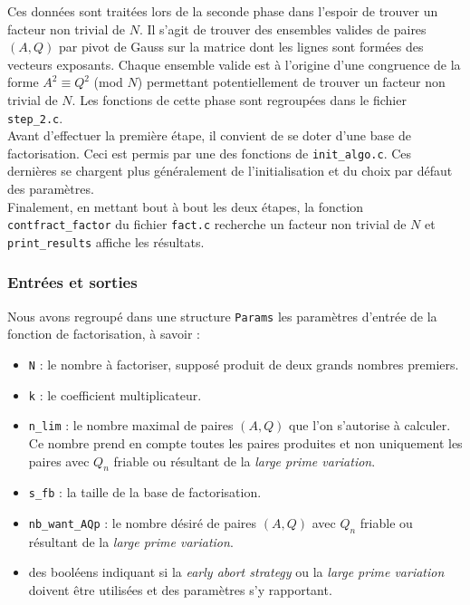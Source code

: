 Ces données sont traitées lors de la seconde phase dans l'espoir de trouver un 
facteur non trivial de $N$. Il s'agit de trouver des ensembles valides de paires
$(A, Q)$ par pivot de Gauss sur la matrice dont les lignes sont formées des 
vecteurs exposants. Chaque ensemble valide est à l'origine d'une congruence de 
la forme $A^2 \equiv Q^2$ (mod $N$) permettant potentiellement de trouver un
facteur non trivial de $N$. Les fonctions de cette phase sont regroupées dans 
le fichier \texttt{step\_2.c}. \\

Avant d'effectuer la première étape, il convient de se doter d'une base de 
factorisation. Ceci est permis par une des fonctions de \texttt{init\_algo.c}.
Ces dernières se chargent plus généralement de l'initialisation et du choix par
défaut des paramètres. \\

Finalement, en mettant bout à bout les deux étapes, la fonction 
\texttt{contfract\_factor} du fichier \texttt{fact.c} recherche un facteur
non trivial de $N$ et \texttt{print\_results} affiche les résultats. 

\subsubsection{Entrées et sorties}
Nous avons regroupé dans une structure \texttt{Params} les paramètres d'entrée 
de la fonction de factorisation, à savoir :

\begin{itemize}
    \item \texttt{N} : le nombre à factoriser, supposé produit de deux grands
                       nombres premiers.
    \item \texttt{k} : le coefficient multiplicateur.
    \item \texttt{n\_lim} : le nombre maximal de paires $(A,Q)$ que l'on 
                             s'autorise à calculer. Ce nombre prend en compte
                             toutes les paires produites et non uniquement les
                             paires avec $Q_n$ friable ou résultant de la  
                             \textit{large prime variation}.
    \item \texttt{s\_fb} : la taille de la base de factorisation. 
    \item \texttt{nb\_want\_AQp} : le nombre désiré de paires $(A,Q)$ avec $Q_n$ 
                                    friable ou résultant de la \textit{large prime 
                                   variation}.
                               \item des booléens indiquant si la \textit{early 
                                   abort strategy} ou la \textit{large prime variation}
                                   doivent être utilisées et des paramètres s'y rapportant.

\end{itemize}

